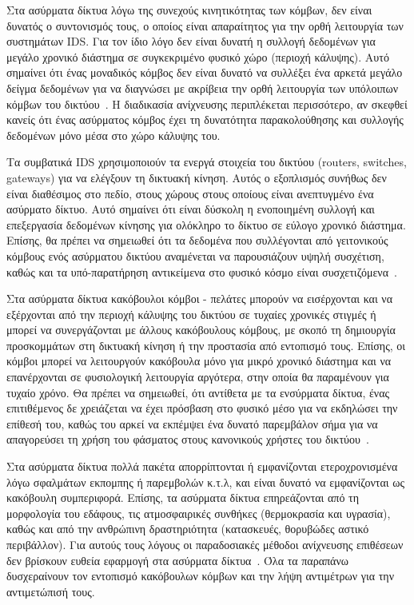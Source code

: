 \documentclass[12pt]{report}
\begin{document}
Στα ασύρματα δίκτυα λόγω της συνεχούς κινητικότητας των κόμβων, δεν είναι δυνατός ο συντονισμός τους, ο οποίος είναι απαραίτητος για την ορθή λειτουργία των συστημάτων \textlatin{IDS}. Για τον ίδιο λόγο δεν είναι δυνατή η συλλογή δεδομένων για μεγάλο χρονικό διάστημα σε συγκεκριμένο φυσικό χώρο (περιοχή κάλυψης). Αυτό σημαίνει ότι ένας μοναδικός κόμβος δεν είναι δυνατό να συλλέξει ένα αρκετά μεγάλο δείγμα δεδομένων για να διαγνώσει με ακρίβεια την ορθή λειτουργία των υπόλοιπων κόμβων του δικτύου~\cite{paper:01}. Η διαδικασία ανίχνευσης περιπλέκεται περισσότερο, αν σκεφθεί κανείς ότι ένας ασύρματος κόμβος έχει τη δυνατότητα παρακολούθησης και συλλογής δεδομένων μόνο μέσα στο χώρο κάλυψης του.

Τα συμβατικά \textlatin{IDS} χρησιμοποιούν τα ενεργά στοιχεία του δικτύου (\textlatin{routers, switches, gateways}) για να ελέγξουν τη δικτυακή κίνηση. Αυτός ο εξοπλισμός συνήθως δεν είναι διαθέσιμος στο πεδίο, στους χώρους στους οποίους είναι ανεπτυγμένο ένα ασύρματο δίκτυο. Αυτό σημαίνει ότι είναι δύσκολη η ενοποιημένη συλλογή και επεξεργασία δεδομένων κίνησης για ολόκληρο το δίκτυο σε εύλογο χρονικό διάστημα. Επίσης, θα πρέπει να σημειωθεί ότι τα δεδομένα που συλλέγονται από γειτονικούς κόμβους ενός ασύρματου δικτύου αναμένεται να παρουσιάζουν υψηλή συσχέτιση, καθώς και τα υπό-παρατήρηση αντικείμενα στο φυσικό κόσμο είναι συσχετιζόμενα~\cite{paper:04}.

Στα ασύρματα δίκτυα κακόβουλοι κόμβοι - πελάτες μπορούν να εισέρχονται και να εξέρχονται από την περιοχή κάλυψης του δικτύου σε τυχαίες χρονικές στιγμές ή μπορεί να συνεργάζονται με άλλους κακόβουλους κόμβους, με σκοπό τη δημιουργία προσκομμάτων στη δικτυακή κίνηση ή την προστασία από εντοπισμό τους. Επίσης, οι κόμβοι μπορεί να λειτουργούν κακόβουλα μόνο για μικρό χρονικό διάστημα και να επανέρχονται σε φυσιολογική λειτουργία αργότερα, στην οποία θα παραμένουν για τυχαίο χρόνο. Θα πρέπει να σημειωθεί, ότι αντίθετα με τα ενσύρματα δίκτυα, ένας επιτιθέμενος δε χρειάζεται να έχει πρόσβαση στο φυσικό μέσο για να εκδηλώσει την επίθεσή του, καθώς του αρκεί να εκπέμψει ένα δυνατό παρεμβάλον σήμα για να απαγορεύσει τη χρήση του φάσματος στους κανονικούς χρήστες του δικτύου~\cite{paper:12}.

Στα ασύρματα δίκτυα πολλά πακέτα απορρίπτονται ή εμφανίζονται ετεροχρονισμένα λόγω σφαλμάτων εκπομπης ή παρεμβολών κ.τ.λ, και είναι δυνατό να εμφανίζονται ως κακόβουλη συμπεριφορά. Επίσης, τα ασύρματα δίκτυα επηρεάζονται από τη μορφολογία του εδάφους, τις ατμοσφαιρικές συνθήκες (θερμοκρασία και υγρασία), καθώς και από την ανθρώπινη δραστηριότητα (κατασκευές, θορυβώδες αστικό περιβάλλον). Για αυτούς τους λόγους οι παραδοσιακές μέθοδοι ανίχνευσης επιθέσεων δεν βρίσκουν ευθεία εφαρμογή στα ασύρματα δίκτυα~\cite{paper:01}. Όλα τα παραπάνω δυσχεραίνουν τον εντοπισμό κακόβουλων κόμβων και την λήψη αντιμέτρων για την αντιμετώπισή τους.
\end{document}
